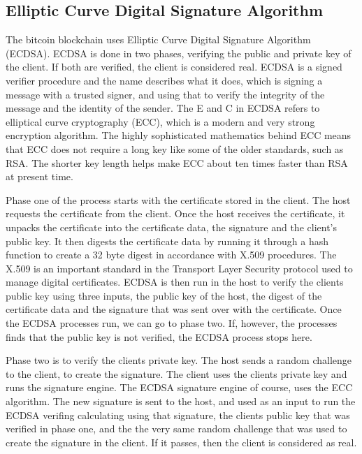 \documentclass[12pt]{article}
\begin{document}
\subsection{Elliptic Curve Digital Signature Algorithm}\label{subsec:ecdsa}
The bitcoin blockchain uses Elliptic Curve Digital Signature Algorithm (ECDSA). ECDSA is done in two phases, verifying the public and private key of the client. If both are verified, the client is considered real. ECDSA is a signed verifier procedure and the name describes what it does, which is signing a message with a trusted signer, and using that to verify the integrity of the message and the identity of the sender. The E and C in ECDSA refers to elliptical curve cryptography (ECC), which is a modern and very strong encryption algorithm. The highly sophisticated mathematics behind ECC means that ECC does not require a long key like some of the older standards, such as RSA. The shorter key length helps make ECC about ten times faster than RSA\cite{jansma2004performance} at present time. 

Phase one of the process starts with the certificate stored in the client. The host requests the certificate from the client. Once the host receives the certificate, it unpacks the certificate into the certificate data, the signature and the client's public key. It then digests the certificate data by running it through a hash function to create a 32 byte digest in accordance with X.509 procedures. The X.509 is an important standard in the Transport Layer Security protocol used to manage digital certificates. ECDSA is then run in the host to verify the clients public key using three inputs, the public key of the host, the digest of the certificate data and the signature that was sent over with the certificate. Once the ECDSA processes run, we can go to phase two. If, however, the processes finds that the public key is not verified, the ECDSA process stops here.

Phase two is to verify the clients private key. The host sends a random challenge to the client, to create the signature. The client uses the clients private key and runs the signature engine. The ECDSA signature engine of course, uses the ECC algorithm. The new signature is sent to the host, and used as an input to run the ECDSA verifing calculating using that signature, the clients public key that was verified in phase one, and the the very same random challenge that was used to create the signature in the client. If it passes, then the client is considered as real. 
\end{document}
